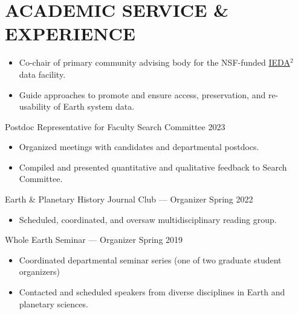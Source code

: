 \section*{ACADEMIC SERVICE \& EXPERIENCE}

\begin{itemize}
	\item Co-chair of primary community advising body for the NSF-funded \href{https://www.iedadata.org/}{IEDA$^2$} data facility.
	\item Guide approaches to promote and ensure access, preservation, and re-usability of Earth system data.
\end{itemize}

Postdoc Representative for Faculty Search Committee \hfill 2023
\begin{itemize}
	\item Organized meetings with candidates and departmental postdocs.
	\item Compiled and presented quantitative and qualitative feedback to Search Committee.
\end{itemize}\vspace*{1ex}

Earth \& Planetary History Journal Club --- Organizer 	 \hfill	Spring 2022
\begin{itemize}
	\item Scheduled, coordinated, and oversaw multidisciplinary reading group.
\end{itemize}

Whole Earth Seminar --- Organizer \hfill  Spring 2019
\begin{itemize}
	\item Coordinated departmental seminar series (one of two graduate student organizers)
	\item Contacted and scheduled speakers from diverse disciplines in Earth and planetary sciences.
\end{itemize}


